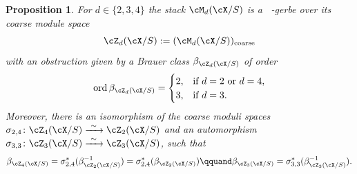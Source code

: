 \documentclass[11pt]{amsart}
\DeclareMathOperator{\Gm}{{\mathrm{G}_{\mathrm{m}}}}
\theoremstyle{plain}
\newtheorem{proposition}[theorem]{Proposition}
\theoremstyle{definition}
\theoremstyle{remark}
\begin{document}
\begin{proposition}
\label{proposition:md-zd}
For $d \in \{2,3,4\}$ the stack $\cM_d(\cX/S)$ is a $\Gm$-gerbe over its coarse module space 
\begin{equation*}
\cZ_d(\cX/S) := (\cM_d(\cX/S))_{\mathrm{coarse}}
\end{equation*}
with an obstruction given by a Brauer class $\beta_{\cZ_d(\cX/S)}$ of order
\begin{equation}
\label{eq:brauer-order}
\operatorname{ord} \beta_{\cZ_d(\cX/S)} = 
\begin{cases}
2, & \text{if $d = 2$ or $d = 4$},\\
3, & \text{if $d = 3$}.
\end{cases}
\end{equation}
Moreover, there is an isomorphism of the coarse moduli spaces $\sigma_{2,4} \colon \cZ_4(\cX/S) \xrightarrow{\ \sim\ } \cZ_2(\cX/S)$ and
an automorphism $\sigma_{3,3} \colon \cZ_3(\cX/S) \xrightarrow{\ \sim\ } \cZ_3(\cX/S)$, 
such that 
\begin{equation*}
\beta_{\cZ_4(\cX/S)} = \sigma_{2,4}^*(\beta_{\cZ_2(\cX/S)}^{-1}) = \sigma_{2,4}^*(\beta_{\cZ_2(\cX/S)})
\qquand
\beta_{\cZ_3(\cX/S)} = \sigma_{3,3}^*(\beta_{\cZ_3(\cX/S)}^{-1}).
\end{equation*}
\end{proposition}
\end{document}
